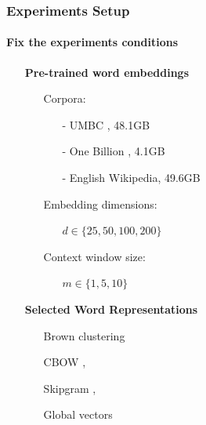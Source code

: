 \documentclass{beamer}
\begin{document}
\begin{frame}
\frametitle{Experiments Setup}
\framesubtitle{Fix the experiments conditions}
  
\begin{itemize}
\item[\ding{224}] \textbf{Pre-trained word embeddings}
	\begin{itemize}			
		\item[\ding{111}] Corpora:
			\begin{itemize}			
				\item[-] UMBC \cite{UMBC:2013}, 48.1GB 
				\item[-] One Billion \cite{OneBillion:2013}, 4.1GB 
				\item[-] English Wikipedia, 49.6GB 		
			\end{itemize}
		\item[\ding{111}] Embedding dimensions:
			\begin{itemize}
				 \item[] $d \in \{25, 50, 100, 200\}$
			\end{itemize}
		\item[\ding{111}] Context window size:
			\begin{itemize}
				 \item[] $m \in \{1, 5, 10\}$	
			\end{itemize}
	\end{itemize}
\item[]
\item[\ding{224}] \textbf{Selected Word Representations} 
	\begin{itemize}
		\item[\ding{76}] Brown clustering \cite{Brown92class-basedn-gram}
		\item[\ding{76}] CBOW \cite{Mikolov13},
		\item[\ding{76}]	 Skipgram \cite{Mikolov13NIPS},
		\item[\ding{76}]	 Global vectors \cite{pennington2014glove} 
	\end{itemize}  	 					
\end{itemize}      
\end{frame}
\end{document}

